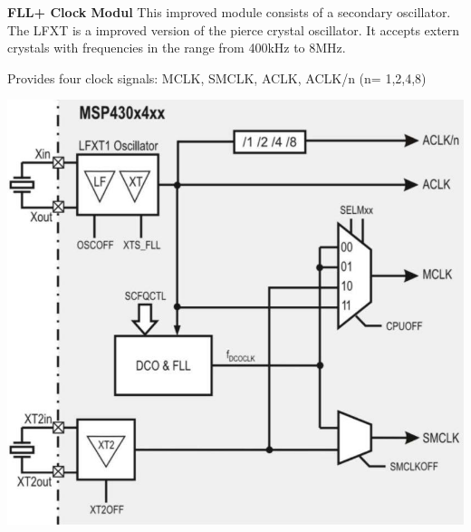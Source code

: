 \vspace{0.5cm}
\begin{minipage}{0.585\linewidth}
    \textbf{FLL+ Clock Modul}\newline\newline
    This improved module consists of a secondary oscillator.\newline
    The LFXT is a improved version of the pierce crystal oscillator. It accepts extern crystals with frequencies in the range from 400kHz to 8MHz.\newline\newline
    
    Provides four clock signals:\newline
    MCLK, SMCLK, ACLK, ACLK/n (n= 1,2,4,8)
\end{minipage}
\begin{minipage}{0.41\linewidth}
\includegraphics[width=0.8\linewidth]{images/FLLpClock} 
\end{minipage}

